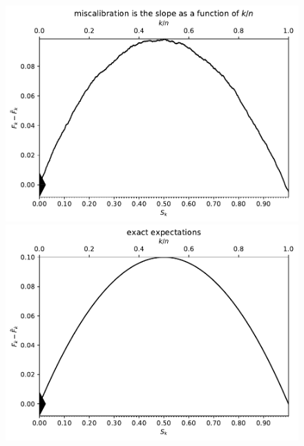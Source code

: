\documentclass{article}
\begin{document}
\begin{figure}
\begin{centering}

\parbox{\imsize}{\includegraphics[width=\imsize]
                {./codes/unweighted/10000_10_0_0/cumulative.pdf}}
\quad\quad
\parbox{\imsize}{\includegraphics[width=\imsize]
                {./codes/unweighted/10000_10_0_0/cumulative_exact.pdf}}

\vspace{\vertsep}


\end{centering}
\end{figure}
\end{document}

